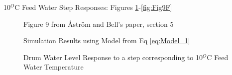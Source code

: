         10$^O$C Feed Water Step Responses: Figures \ref{fig:Fig9A}-\ref{fig:Fig9F}
        \begin{figure}[ht]
            \begin{center}
                
                Figure 9 from \r{A}str\"{o}m and Bell's paper, section 5 \cite{Astrom}
                
                
                Simulation Results using Model from Eq \eqref{eq:Model_1}
                
                \caption{Drum Water Level Response to a step corresponding to 10$^O$C Feed Water Temperature}
                \label{fig:Fig9A}
            \end{center}
        \end{figure}  %
